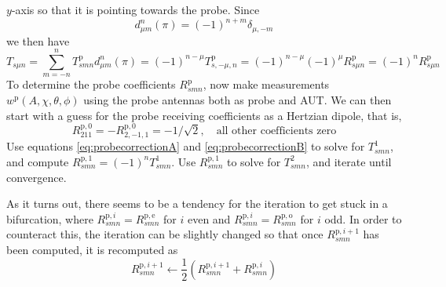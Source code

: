 \documentclass[a4paper,12pt]{article}
\newcommand{\mrm}[1]{\mathrm{#1}}
\begin{document}
$y$-axis so that it is pointing towards the probe. Since
\cite[Eq. (A2.16)]{Hansen1988}
\begin{equation}
  d_{\mu m}^{n}(\pi) = (-1)^{n+m}\delta_{\mu,-m}
\end{equation}
we then have
\begin{equation}
  T_{s\mu n} = \sum_{m=-n}^{n}T_{smn}^{\mrm{p}}d_{\mu m}^{n}(\pi) = (-1)^{n-\mu}T_{s,-\mu,n}^{\mrm{p}} = (-1)^{n-\mu}(-1)^{\mu}R_{s\mu n}^{\mrm{p}} = (-1)^{n} R_{s\mu n}^{\mrm{p}}
\end{equation}
To determine the probe coefficients $R_{smn}^{\mrm{p}}$, now make
measurements $w^{\mrm{p}}(A,\chi,\theta,\phi)$ using the probe
antennas both as probe and AUT. We can then start with a guess for the
probe receiving coefficients as a Hertzian dipole, that is,
\begin{equation}
  R_{211}^{\mrm{p},0} = -R_{2,-1,1}^{\mrm{p},0} = -1/\sqrt{2}, \quad \text{all other coefficients zero}
\end{equation}
Use equations \eqref{eq:probecorrectionA} and
\eqref{eq:probecorrectionB} to solve for $T_{smn}^{1}$, and compute
$R_{smn}^{\mrm{p},1} = (-1)^{n}T_{smn}^{1}$. Use $R_{smn}^{\mrm{p},1}$
to solve for $T_{smn}^{2}$, and iterate until convergence.

As it turns out, there seems to be a tendency for the iteration to get
stuck in a bifurcation, where
$R_{smn}^{\mrm{p},i}=R_{smn}^{\mrm{p,e}}$ for $i$ even and
$R_{smn}^{\mrm{p},i}=R_{smn}^{\mrm{p,o}}$ for $i$ odd. In order to
counteract this, the iteration can be slightly changed so that once
$R_{smn}^{\mrm{p},i+1}$ has been computed, it is recomputed as
\begin{equation}
  R_{smn}^{\mrm{p},i+1} \leftarrow \frac{1}{2}\left( R_{smn}^{\mrm{p},i+1} + R_{smn}^{\mrm{p},i} \right)
\end{equation}



\end{document}
